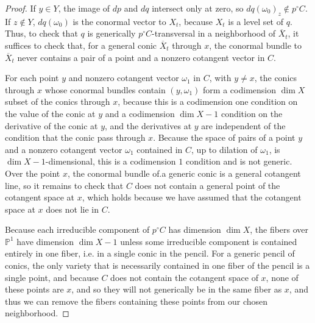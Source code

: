 \documentclass[12pt]{amsart}
\theoremstyle{definition}
\theoremstyle{remark}
\begin{document}
\begin{proof}
If $y\in Y$, the image of $dp$ and $dq$ intersect only at zero, so $dq(\omega_0)_z \notin p^\circ C$. If $z\notin Y$,  $dq(\omega_0 )$ is the conormal vector to  $X_t$, because $X_t$ is a level set of $q$. Thus, to check that  $q$ is generically $p^\circ C$-transversal in a neighborhood of $\overline{X}_t$, it suffices to check that, for a general conic $\overline{X}_t$ through $x$, the conormal bundle to $\overline{X}_t$ never contains a pair of a point and a nonzero cotangent vector in $C$. 

For each point $y$ and nonzero cotangent vector $\omega_1$ in $C$, with $y\neq x$, the conics through $x$ whose conormal bundles contain $(y, \omega_1)$ form a codimension $\dim X$ subset of the conics through $x$, because this is a codimension one condition on the value of the conic at $y$ and a codimension $\dim X-1$ condition on the derivative of the conic at $y$, and the derivatives at $y$ are independent of the condition that the conic pass through $x$. Because the space of pairs of a point $y$ and a nonzero cotangent vector $\omega_1$ contained in $C$, up to dilation of $\omega_1$, is $\dim X-1$-dimensional, this is a codimension $1$ condition and is not generic. Over the point $x$, the conormal bundle of.a generic conic is a general cotangent line, so it remains to check that $C$ does not contain a general point of the cotangent space at $x$, which holds because we have assumed that the cotangent space at $x$ does not lie in $C$.

Because each irreducible component of $p^\circ C$ has dimension $\dim X$, the fibers over $\mathbb P^1$ have dimension $\dim X -1$ unless some irreducible component is contained entirely in one fiber, i.e. in a single conic in the pencil.  For a generic pencil of conics, the only variety that is necessarily contained in one fiber of the pencil is a single point, and because $C$ does not contain the cotangent space of $x$, none of these points are $x$, and so they will not generically be in the same fiber as $x$, and thus we can remove the fibers containing these points from our chosen neighborhood.
\end{proof}
\end{document}
